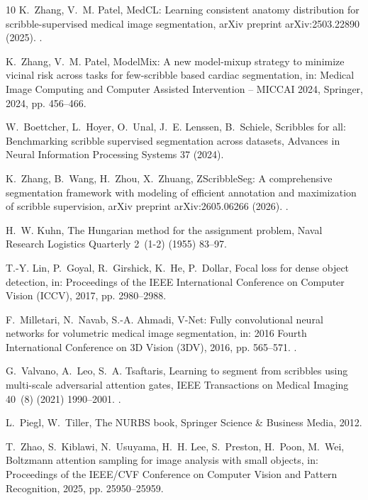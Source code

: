 \documentclass[preprint,12pt]{elsarticle}
\begin{document}
\begin{thebibliography}{10}
K.~Zhang, V.~M. Patel, {MedCL}: Learning consistent anatomy distribution for
  scribble-supervised medical image segmentation, arXiv preprint
  arXiv:2503.22890 (2025).
\newblock \href {https://doi.org/10.48550/arXiv.2503.22890}
  {}.

K.~Zhang, V.~M. Patel, {ModelMix}: A new model-mixup strategy to minimize
  vicinal risk across tasks for few-scribble based cardiac segmentation, in:
  Medical Image Computing and Computer Assisted Intervention -- MICCAI 2024,
  Springer, 2024, pp. 456--466.

W.~Boettcher, L.~Hoyer, O.~Unal, J.~E. Lenssen, B.~Schiele, Scribbles for all:
  Benchmarking scribble supervised segmentation across datasets, Advances in
  Neural Information Processing Systems 37 (2024).

K.~Zhang, B.~Wang, H.~Zhou, X.~Zhuang, {ZScribbleSeg}: A comprehensive
  segmentation framework with modeling of efficient annotation and maximization
  of scribble supervision, arXiv preprint arXiv:2605.06266 (2026).
\newblock \href {https://doi.org/10.48550/arXiv.2605.06266}
  {}.

H.~W. Kuhn, The {Hungarian} method for the assignment problem, Naval Research
  Logistics Quarterly 2~(1-2) (1955) 83--97.

T.-Y. Lin, P.~Goyal, R.~Girshick, K.~He, P.~Dollar, Focal loss for dense object
  detection, in: Proceedings of the IEEE International Conference on Computer
  Vision (ICCV), 2017, pp. 2980--2988.

F.~Milletari, N.~Navab, S.-A. Ahmadi, {V-Net}: Fully convolutional neural
  networks for volumetric medical image segmentation, in: 2016 Fourth
  International Conference on 3D Vision (3DV), 2016, pp. 565--571.
\newblock \href {https://doi.org/10.1109/3DV.2016.79}
  {}.

G.~Valvano, A.~Leo, S.~A. Tsaftaris, Learning to segment from scribbles using
  multi-scale adversarial attention gates, IEEE Transactions on Medical Imaging
  40~(8) (2021) 1990--2001.
\newblock \href {https://doi.org/10.1109/TMI.2021.3059964}
  {}.

L.~Piegl, W.~Tiller, The {NURBS} book, Springer Science \& Business Media,
  2012.

T.~Zhao, S.~Kiblawi, N.~Usuyama, H.~H. Lee, S.~Preston, H.~Poon, M.~Wei,
  Boltzmann attention sampling for image analysis with small objects, in:
  Proceedings of the IEEE/CVF Conference on Computer Vision and Pattern
  Recognition, 2025, pp. 25950--25959.

\end{thebibliography}
\end{document}
